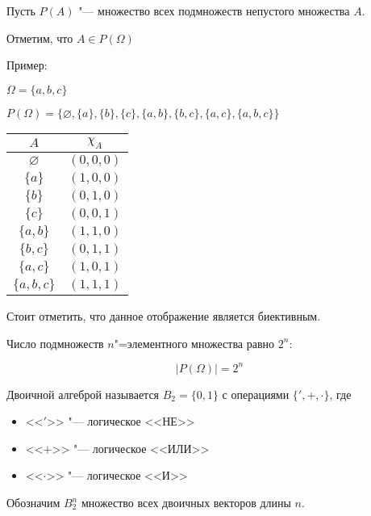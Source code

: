Пусть $P(A)$ "--- множество всех подмножеств непустого множества $A$. 

Отметим, что $A \in P(\Omega)$

Пример:

$\Omega = \{a, b, c\}$

$P(\Omega) = \{ \varnothing, \{a\}, \{b\}, \{c\}, \{a, b\}, \{b, c\}, \{a, c\}, \{a, b, c\} \}$
\begin{center}
    \begin{tabularx}{0.2\textwidth}{c|c}
        $A$ & $\chi_A$ \\ \hline
        $\varnothing$ & $(0, 0, 0)$ \\
        $\{ a \}$ & $(1, 0, 0)$ \\  
        $\{ b \}$ & $(0, 1, 0)$ \\  
        $\{ c \}$ & $(0, 0, 1)$ \\  
        $\{ a,b \}$ & $(1, 1, 0)$ \\  
        $\{ b,c \}$ & $(0, 1, 1)$ \\  
        $\{ a,c \}$ & $(1, 0, 1)$ \\  
        $\{ a,b,c \}$ & $(1, 1, 1)$ \\  
    \end{tabularx}    
\end{center}

Стоит отметить, что данное отображение является биективным. 

\begin{theorem}
    Число подмножеств $n$"=элементного множества равно $2^n$:

    \begin{equation*}
        |P(\Omega)| = 2^n
    \end{equation*}
    
\end{theorem}

Двоичной алгеброй называется $B_2 = \{ 0, 1\}$ с операциями $\{', +, \cdot\}$, где


\begin{itemize}
    \item <<$'$>> "--- логическое <<НЕ>>
    \item <<$+$>> "--- логическое <<ИЛИ>>
    \item <<$\cdot$>> "--- логическое <<И>>
\end{itemize}


Обозначим $B_2^n$ множество всех двоичных векторов длины $n$.


